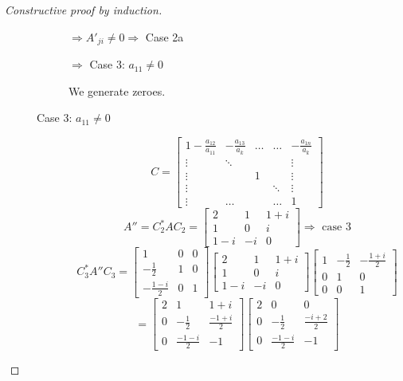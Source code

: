 \documentclass[a4paper,landscape,twocolumn]{article}
\theoremstyle{definition}
\begin{document}
\begin{proof}[Constructive proof by induction]
\begin{description}
\begin{description}
          $\Rightarrow A'_{ji} \neq 0 \Rightarrow$ Case 2a

          $\Rightarrow$ Case 3: $a_{11} \neq 0$

          We generate zeroes.

        \item[Case 3: $a_{11} \neq 0$]
          \[
            C = \begin{bmatrix}
              1 - \frac{a_{12}}{a_{11}} & -\frac{a_{13}}{a_{k}} & \ldots & \ldots & -\frac{a_{1n}}{a_{k}} \\
              \vdots & \ddots &   &        & \vdots \\
              \vdots &        & 1 &        & \vdots \\
              \vdots &        &   & \ddots & \vdots \\
              \vdots & \ldots &   & \ldots & 1
            \end{bmatrix}
          \] \[
            A'' = C_2^* A C_2 = \begin{bmatrix}
              2 & 1 & 1+i \\
              1 & 0 & i \\
              1-i & -i & 0
            \end{bmatrix}
            \Rightarrow \text{ case 3}
          \] \[
            C_3^* A'' C_3 =
            \begin{bmatrix}
              1 & 0 & 0 \\
              -\frac12 & 1 & 0 \\
              -\frac{1-i}{2} & 0 & 1
            \end{bmatrix}
            \begin{bmatrix}
              2 & 1 & 1+i \\
              1 & 0 & i \\
              1-i & -i & 0
            \end{bmatrix}
            \begin{bmatrix}
              1 & -\frac12 & -\frac{1+i}{2} \\
              0 & 1 & 0 \\
              0 & 0 & 1
            \end{bmatrix}
          \] \[
            = \begin{bmatrix}
              2 & 1 & 1+i \\
              0 & -\frac12 & \frac{-1+i}{2} \\
              0 & \frac{-1-i}{2} & -1
            \end{bmatrix} \begin{bmatrix}
              2 & 0 & 0 \\
              0 & -\frac12 & \frac{-i+2}{2} \\
              0 & \frac{-1-i}{2} & -1
            \end{bmatrix}
          \]
      \end{description}
  \end{description}
\end{proof}
\end{document}
